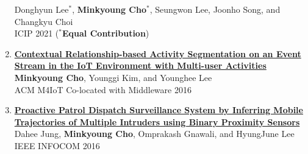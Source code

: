 \documentclass[letterpaper,oneside,11pt]{article}
\begin{document}
\begin{enumerate}[leftmargin=*, itemsep=0em]
  Donghyun Lee$^\ast$, \textbf{Minkyoung Cho$^\ast$}, Seungwon Lee, Joonho Song, and Changkyu Choi \\
  ICIP 2021 ($^\ast$\textbf{Equal Contribution})
  \item \small \textbf{\href{https://dl.acm.org/doi/10.1145/3008631.3008633}{Contextual Relationship-based Activity Segmentation on an Event Stream in the IoT Environment with Multi-user Activities}}\\
  \textbf{Minkyoung Cho}, Younggi Kim, and Younghee Lee\\
  ACM M4IoT Co-located with Middleware 2016
  \item \small \textbf{\href{https://ieeexplore.ieee.org/abstract/document/7524369}{Proactive Patrol Dispatch Surveillance System by Inferring Mobile Trajectories of Multiple Intruders using Binary Proximity Sensors}}\\
  Dahee Jung, \textbf{Minkyoung Cho}, Omprakash Gnawali, and HyungJune Lee\\  
  IEEE INFOCOM 2016
\end{enumerate}

\end{document}

